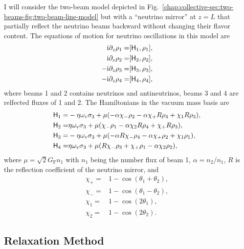 I will consider the two-beam model depicted in Fig.~\ref{chap:collective-sec:two-beams-fig:two-beam-line-model} but with a ``neutrino mirror'' at $z=L$ that partially reflect the neutrino beams backward without changing their flavor content. The equations of motion for neutrino oscillations in this model are
\begin{align}
    \mathrm{i} \partial_z \rho_1 = & [ \mathsf H_1, \rho_1 ], \\
    \mathrm{i} \partial_z \rho_2 = & [ \mathsf H_2, \rho_2 ], \\
    -\mathrm{i} \partial_z \rho_3 = & [ \mathsf H_3, \rho_3 ], \\
    -\mathrm{i} \partial_z \rho_4 = & [ \mathsf H_4, \rho_4 ],
\end{align}
where beams 1 and 2 contains neutrinos and antineutrinos, beams 3 and 4 are relfected fluxes of 1 and 2. The Hamiltonians in the vacuum mass basis are 
\begin{align}
    \mathsf H_1 =& -\eta \omega_\mathrm v \sigma_3 + \mu( -\alpha \chi_-  \rho_2 - \alpha \chi_+ R \rho_4 + \chi_1 R  \rho_3), \\
    \mathsf H_2 =& \eta \omega_\mathrm v \sigma_3 + \mu( \chi_- \rho_1 -\alpha \chi_2 R  \rho_4 + \chi_+ R  \rho_3), \\
    \mathsf H_3 =& -\eta \omega_\mathrm v \sigma_3 + \mu( -\alpha R  \chi_-  \rho_4 -\alpha \chi_+ \rho_2 + \chi_1  \rho_1), \\
    \mathsf H_4 =& \eta \omega_\mathrm v \sigma_3 + \mu( R   \chi_- \rho_3 + \chi_+  \rho_1 -\alpha \chi_2  \rho_2),
\end{align}
where $\mu=\sqrt{2}G_{\mathrm F}n_1$ with $n_1$ being the number flux of beam 1, $\alpha=n_2/n_1$, $R$ is the reflection coefficient of the neutrino mirror, and 
\begin{align*}
    \chi_+ = & 1 - \cos ( \theta_1 + \theta_2 ), \\
    \chi_- = & 1 - \cos ( \theta_1 - \theta_2 ), \\
    \chi_1 = & 1 - \cos ( 2\theta_1 ), \\
    \chi_2 = & 1 - \cos ( 2\theta_2 ).
\end{align*}




\subsection{\label{chap:halo-sec:num}Relaxation Method}



